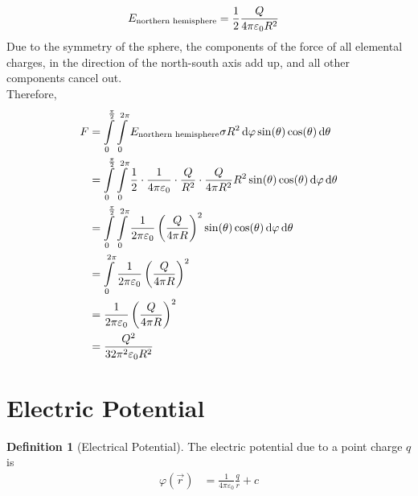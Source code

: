 \documentclass[fleqn, a4paper, 8pt, twoside]{amsart}
\theoremstyle{definition}
\newtheorem{definition}{Definition}
\theoremstyle{theorem}
\begin{document}
\begin{multicols}{2}
\begin{spacing}{0.6}
\begin{solution}
	\begin{align*}
		E_{\textnormal{northern hemisphere}} &= \frac{1}{2} \frac{Q}{4 \pi \varepsilon_0 R^2}
	\end{align*}
	Due to the symmetry of the sphere, the components of the force of all elemental charges, in the direction of the north-south axis add up, and all other components cancel out.\\
	Therefore,
	\begin{align*}
		F & = \int\limits_{0}^{\frac{\pi}{2}} \int\limits_{0}^{2 \pi} E_{\textnormal{northern hemisphere}} \sigma R^2 \dif \varphi \sin(\theta) \cos(\theta) \dif \theta                                                       \\
                  & = \int\limits_{0}^{\frac{\pi}{2}} \int\limits_{0}^{2 \pi} \frac{1}{2} \cdot \frac{1}{4 \pi \varepsilon_0} \cdot \frac{Q}{R^2} \cdot \frac{Q}{4 \pi R^2} R^2 \sin(\theta) \cos(\theta) \dif \varphi \dif \theta \\
                  & = \int\limits_{0}^{\frac{\pi}{2}} \int\limits_{0}^{2 \pi} \frac{1}{2 \pi \varepsilon_0} \left( \frac{Q}{4 \pi R} \right)^2 \sin(\theta) \cos(\theta) \dif \varphi \dif \theta                                    \\
                  & = \int\limits_{0}^{2 \pi} \frac{1}{2 \pi \varepsilon_0} \left( \frac{Q}{4 \pi R} \right)^2                                                                                                                        \\
                  & = \frac{1}{2 \pi \varepsilon_0} \left( \frac{Q}{4 \pi R} \right)^2                                                                                                                                                \\
                  & = \frac{Q^2}{32 \pi^2 \varepsilon_0 R^2}
	\end{align*}
\end{solution}

\section{Electric Potential}

\begin{definition}[Electrical Potential]
	The electric potential due to a point charge $q$ is
	\begin{align*}
		\varphi \left( \overrightarrow{r} \right) &= \frac{1}{4 \pi \varepsilon_0} \frac{q}{r} + c
	\end{align*}
\end{definition}


\end{spacing}
\end{multicols}
\end{document}
